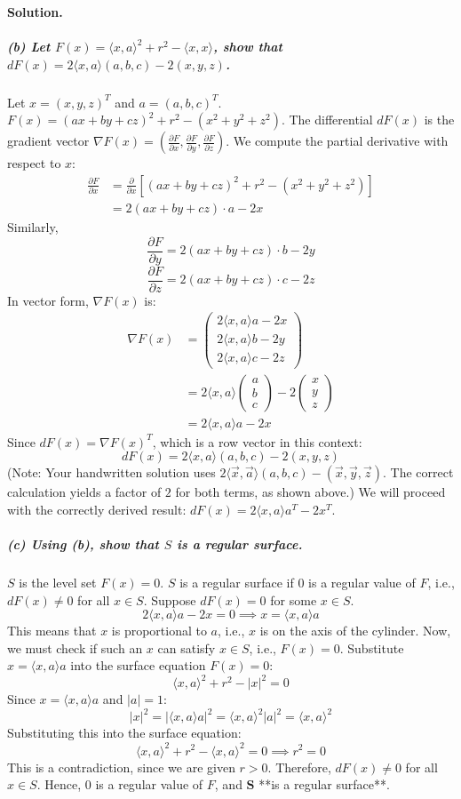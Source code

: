 \documentclass[12pt, a4paper, oneside]{article}
\newenvironment{solution}
  {\par\noindent\textbf{Solution. }\newline}
  {\par}
\begin{document}
\begin{solution}
\subparagraph{(b) Let $F(x)=\langle x,a\rangle^{2}+r^{2}-\langle x,x\rangle$, show that $dF(x)=2\langle x,a\rangle(a,b,c)-2(x,y,z)$.}
Let $x = (x,y,z)^T$ and $a = (a,b,c)^T$.
$F(x) = (ax+by+cz)^2 + r^2 - (x^2+y^2+z^2)$.
The differential $dF(x)$ is the gradient vector $\nabla F(x) = \left(\frac{\partial F}{\partial x}, \frac{\partial F}{\partial y}, \frac{\partial F}{\partial z}\right)$.
We compute the partial derivative with respect to $x$:
\begin{align*}
\frac{\partial F}{\partial x} &= \frac{\partial}{\partial x} \left[ (ax+by+cz)^2 + r^2 - (x^2+y^2+z^2) \right] \\
&= 2(ax+by+cz) \cdot a - 2x
\end{align*}
Similarly,
$$
\frac{\partial F}{\partial y} = 2(ax+by+cz) \cdot b - 2y
$$
$$
\frac{\partial F}{\partial z} = 2(ax+by+cz) \cdot c - 2z
$$
In vector form, $\nabla F(x)$ is:
\begin{align*}
\nabla F(x) &= \begin{pmatrix} 2\langle x,a\rangle a - 2x \\ 2\langle x,a\rangle b - 2y \\ 2\langle x,a\rangle c - 2z \end{pmatrix} \\
&= 2\langle x,a\rangle \begin{pmatrix} a \\ b \\ c \end{pmatrix} - 2 \begin{pmatrix} x \\ y \\ z \end{pmatrix} \\
&= 2\langle x,a\rangle a - 2x
\end{align*}
Since $dF(x) = \nabla F(x)^T$, which is a row vector in this context:
$$
dF(x) = 2\langle x,a\rangle(a,b,c) - 2(x,y,z)
$$
(Note: Your handwritten solution uses $2\langle \vec{x},\vec{a}\rangle (a,b,c) - (\vec{x}, \vec{y}, \vec{z})$. The correct calculation yields a factor of $2$ for both terms, as shown above.)
We will proceed with the correctly derived result: $dF(x) = 2\langle x,a\rangle a^T - 2x^T$.

\subparagraph{(c) Using (b), show that $S$ is a regular surface.}
$S$ is the level set $F(x) = 0$. $S$ is a regular surface if $0$ is a regular value of $F$, i.e., $dF(x) \neq 0$ for all $x \in S$.
Suppose $dF(x) = 0$ for some $x \in S$.
$$
2\langle x,a\rangle a - 2x = 0 \implies x = \langle x,a\rangle a
$$
This means that $x$ is proportional to $a$, i.e., $x$ is on the axis of the cylinder.
Now, we must check if such an $x$ can satisfy $x \in S$, i.e., $F(x)=0$.
Substitute $x = \langle x,a\rangle a$ into the surface equation $F(x)=0$:
$$
\langle x,a\rangle^2 + r^2 - |x|^2 = 0
$$
Since $x = \langle x,a\rangle a$ and $|a|=1$:
$$
|x|^2 = |\langle x,a\rangle a|^2 = \langle x,a\rangle^2 |a|^2 = \langle x,a\rangle^2
$$
Substituting this into the surface equation:
$$
\langle x,a\rangle^2 + r^2 - \langle x,a\rangle^2 = 0 \implies r^2 = 0
$$
This is a contradiction, since we are given $r>0$.
Therefore, $dF(x) \neq 0$ for all $x \in S$.
Hence, $0$ is a regular value of $F$, and $\mathbf{S}$ **is a regular surface**.


\end{solution}
\end{document}
